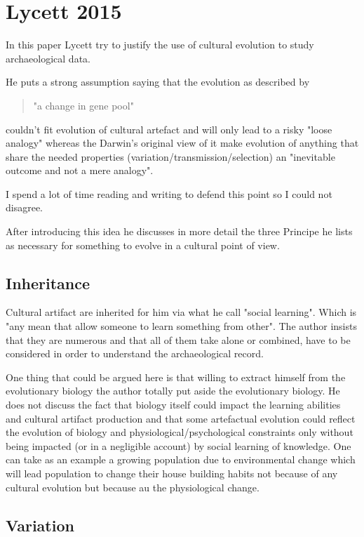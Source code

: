 \documentclass[]{article}
\begin{document}
\section{ Lycett 2015}
  
In this paper Lycett try to justify the use of cultural evolution to study archaeological data.

He puts a strong assumption saying that the evolution as described by 
\begin{quotation}
"a change in gene pool"
\end{quotation}
couldn't fit evolution of cultural artefact and will only lead to a risky "loose analogy" whereas the Darwin's original view of it make evolution of anything that share the needed properties (variation/transmission/selection) an "inevitable outcome and not a mere analogy".

I spend a lot of time reading and writing to defend this point so I could not disagree.

After introducing this idea he discusses in more detail the three Principe he lists as necessary for something to evolve in a cultural point of view.

\subsection{Inheritance}

Cultural artifact are inherited for him via what he call "social learning". Which is "any mean that allow someone to learn something from other". The author insists that they are numerous and that all of them take alone or combined, have to be considered in order to understand the archaeological record.

One thing that could be argued here is that willing to extract himself from the evolutionary biology the author totally put aside the evolutionary biology. He does not discuss the fact that biology itself could impact the learning abilities and cultural artifact production and that some artefactual evolution could reflect the evolution of biology and physiological/psychological constraints only without being impacted (or in a negligible account) by social learning of knowledge. One can take as an example a growing population due to environmental change which will lead population to change their house building habits not because of any cultural evolution but because au the physiological change.


\subsection{Variation}
\end{document}
